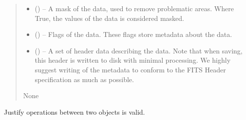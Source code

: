 \documentclass[letterpaper,11pt,english]{sphinxmanual}
\begin{document}
\begin{savenotes}
\begin{fulllineitems}
\begin{savenotes}
\begin{fulllineitems}
\begin{quote}
\begin{description}
\begin{itemize}
\item {} 
\sphinxAtStartPar
{} () – A mask of the data, used to remove problematic areas. Where True,
the values of the data is considered masked.

\item {} 
\sphinxAtStartPar
{} () – Flags of the data. These flags store metadata about the data.

\item {} 
\sphinxAtStartPar
{} (\sphinxstyleliteralemphasis{\sphinxupquote{, }}) – A set of header data describing the data. Note that when saving,
this header is written to disk with minimal processing. We highly
suggest writing of the metadata to conform to the FITS Header
specification as much as possible.

\end{itemize}

\sphinxAtStartPar
None

\end{description}\end{quote}

\end{fulllineitems}\end{savenotes}


\begin{savenotes}\begin{fulllineitems}
\label{\detokenize{code/lezargus.container.parent:lezargus.container.parent.LezargusContainerArithmetic.__justify_arithmetic_operation}}
\pysigstartsignatures
{}
\pysigstopsignatures
\sphinxAtStartPar
Justify operations between two objects is valid.


\end{fulllineitems}
\end{savenotes}
\end{fulllineitems}
\end{savenotes}
\end{document}
